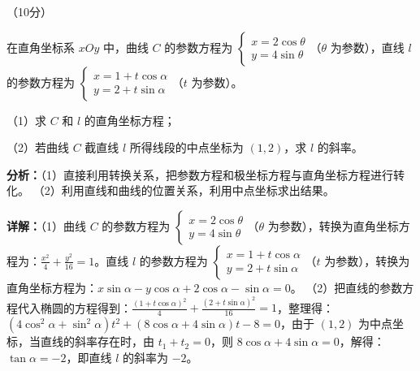 \begin{question}[points=10]
[选修4-4：坐标系与参数方程]（10分）

在直角坐标系 $xOy$ 中，曲线 $C$ 的参数方程为 $\begin{cases} x=2\cos\theta \\ y=4\sin\theta \end{cases}$（$\theta$ 为参数），直线 $l$ 的参数方程为 $\begin{cases} x=1+t\cos\alpha \\ y=2+t\sin\alpha \end{cases}$（$t$ 为参数）。

（1）求 $C$ 和 $l$ 的直角坐标方程；

（2）若曲线 $C$ 截直线 $l$ 所得线段的中点坐标为 $(1,2)$，求 $l$ 的斜率。
\begin{solution}

\textbf{分析：}（1）直接利用转换关系，把参数方程和极坐标方程与直角坐标方程进行转化。
（2）利用直线和曲线的位置关系，利用中点坐标求出结果。

\textbf{详解：}（1）曲线 $C$ 的参数方程为 $\begin{cases} x=2\cos\theta \\ y=4\sin\theta \end{cases}$（$\theta$ 为参数），转换为直角坐标方程为：$\frac{x^2}{4}+\frac{y^2}{16}=1$。直线 $l$ 的参数方程为 $\begin{cases} x=1+t\cos\alpha \\ y=2+t\sin\alpha \end{cases}$（$t$ 为参数），转换为直角坐标方程为：$x\sin\alpha-y\cos\alpha+2\cos\alpha-\sin\alpha=0$。
（2）把直线的参数方程代入椭圆的方程得到：$\frac{(1+t\cos\alpha)^2}{4}+\frac{(2+t\sin\alpha)^2}{16}=1$，整理得：$(4\cos^2\alpha+\sin^2\alpha)t^2+(8\cos\alpha+4\sin\alpha)t-8=0$，由于 $(1,2)$ 为中点坐标，当直线的斜率存在时，由 $t_1+t_2=0$，则 $8\cos\alpha+4\sin\alpha=0$，解得：$\tan\alpha=-2$，即直线 $l$ 的斜率为 $-2$。
\end{solution}
\end{question}

